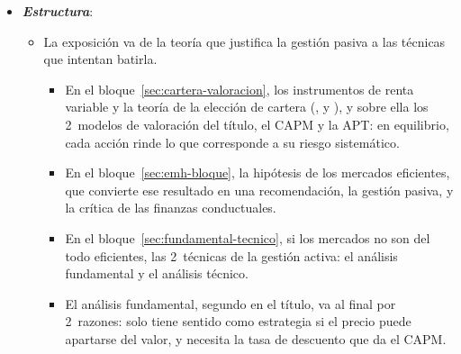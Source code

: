 \documentclass[11pt]{article}
\begin{document}
\begin{itemize}
\item \textbf{\emph{Estructura}}:
  \begin{itemize}
  \item La exposición va de la teoría que justifica la gestión pasiva a las técnicas que intentan batirla.
  \begin{itemize}
  \item En el bloque~\ref{sec:cartera-valoracion}, los instrumentos de renta variable y la teoría de la elección de cartera (,  y ), y sobre ella los 2~modelos de valoración del título, el CAPM y la APT: en equilibrio, cada acción rinde lo que corresponde a su riesgo sistemático.
  \item En el bloque~\ref{sec:emh-bloque}, la hipótesis de los mercados eficientes, que convierte ese resultado en una recomendación, la gestión pasiva, y la crítica de las finanzas conductuales.
  \item En el bloque~\ref{sec:fundamental-tecnico}, si los mercados no son del todo eficientes, las 2~técnicas de la gestión activa: el análisis fundamental y el análisis técnico.
  \item El análisis fundamental, segundo en el título, va al final por 2~razones: solo tiene sentido como estrategia si el precio puede apartarse del valor, y necesita la tasa de descuento que da el CAPM.
  \end{itemize}
  \end{itemize}
\end{itemize}
\end{document}
